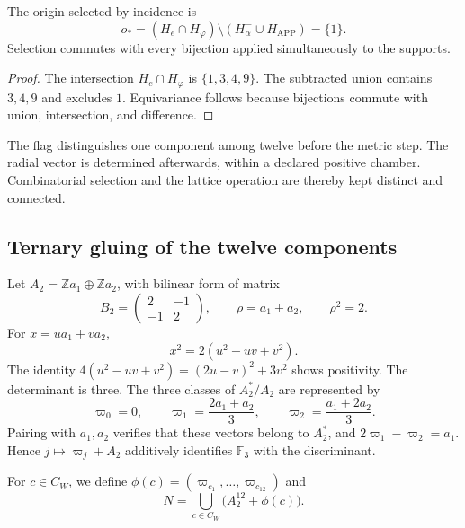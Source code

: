 \begin{lemma}
\label{lem:lf-origin}
The origin selected by incidence is
\[
 o_*=(H_e\cap H_\varphi)
                 \setminus(H_\alpha^-\cup H_{\mathrm{APP}})
     =\{1\}.
\]
Selection commutes with every bijection applied
simultaneously to the supports.
\end{lemma}
\begin{proof}
The intersection \(H_e\cap H_\varphi\) is
\(\{1,3,4,9\}\). The subtracted union contains \(3,4,9\)
and excludes \(1\). Equivariance follows because
bijections commute with union, intersection, and difference.
\end{proof}

The flag distinguishes one component among twelve before the
metric step. The radial vector is determined afterwards,
within a declared positive chamber. Combinatorial selection
and the lattice operation are thereby kept
distinct and connected.

\subsection{Ternary gluing of the twelve components}
\label{subsec:lf-glue}

Let \(A_2=\mathbb Za_1\oplus\mathbb Za_2\), with bilinear
form of matrix
\[
 B_2=\begin{pmatrix}2&-1\\-1&2\end{pmatrix},
 \qquad \rho=a_1+a_2,\qquad \rho^2=2.
\]
For \(x=ua_1+va_2\),
\[
 x^2=2(u^2-uv+v^2).
\]
The identity
\(4(u^2-uv+v^2)=(2u-v)^2+3v^2\) shows
positivity. The determinant is three. The three
classes of \(A_2^*/A_2\) are represented by
\[
 \varpi_0=0,\qquad
 \varpi_1=\frac{2a_1+a_2}{3},\qquad
 \varpi_2=\frac{a_1+2a_2}{3}.
\]
Pairing with \(a_1,a_2\) verifies that these
vectors belong to \(A_2^*\), and
\(2\varpi_1-\varpi_2=a_1\). Hence
\(j\mapsto\varpi_j+A_2\) additively identifies
\(\mathbb F_3\) with the discriminant.

For \(c\in C_W\), we define
\(\phi(c)=(\varpi_{c_1},\ldots,\varpi_{c_{12}})\)
and
\begin{equation}
 N=\bigcup_{c\in C_W}\bigl(A_2^{12}+\phi(c)\bigr).
 \label{eq:lf-glue}
\end{equation}

